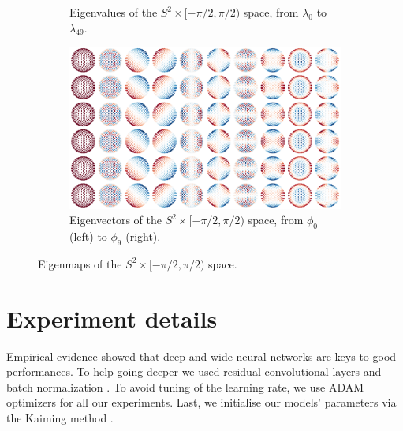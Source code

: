 \documentclass{article}
\begin{document}
\begin{figure}[h!] 
    \centering
    \begin{subfigure}[b]{0.9\textwidth}
        \centering
        \caption{Eigenvalues of the $S^2 \times [-\pi/2, \pi/2)$ space, from $\lambda_0$ to $\lambda_{49}$.}
    \end{subfigure}
    \hfill
    \begin{subfigure}[b]{\textwidth}
        \centering
        \includegraphics[width=\textwidth]{Images/so3_eigenvecs.png}
        \caption{Eigenvectors of the $S^2 \times [-\pi/2, \pi/2)$ space, from $\phi_0$ (left) to $\phi_9$ (right).}
    \end{subfigure}
    \caption{Eigenmaps of the $S^2 \times [-\pi/2, \pi/2)$ space.}
    \label{fig:so3_eigenmaps}
\end{figure}




\clearpage

\section{Experiment details} \label{app:experiment_details}

Empirical evidence showed that deep and wide neural networks are keys to good performances. To help going deeper we used residual convolutional layers \citep{he2016deep} and batch normalization \citep{ioffe2015batch}. To avoid tuning of the learning rate, we use ADAM optimizers \citep{kingma2014adam} for all our experiments. Last, we initialise our models' parameters via the Kaiming method \citep{he2015delving}. 
\end{document}
